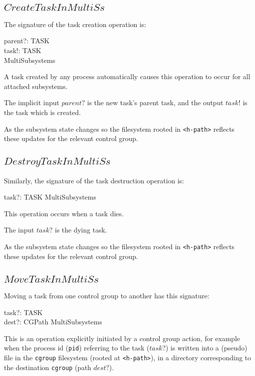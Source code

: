 \documentclass[a4paper,twoside,12pt]{article}
\begin{document}
\subsection{$CreateTaskInMultiSs$}

The signature of the task creation operation is:
\begin{schema*}
    parent?: TASK \\
    task!: TASK \\
\also
    \Delta MultiSubsystems
\end{schema*}
A task created by any process automatically causes this operation to occur for all attached subsystems.

The implicit input $parent?$ is the new task's parent task, and the output $task!$ is the task which is created.

As the subsystem state changes so the
filesystem rooted in \texttt{<h-path>} reflects these updates for the relevant control group.

\subsection{$DestroyTaskInMultiSs$}

Similarly, the signature of the task destruction operation is:
\begin{schema*}
    task?: TASK
\also 
    \Delta MultiSubsystems
\end{schema*}
This operation occurs when a task dies.

The input $task?$ is the dying task.

As the subsystem state changes so the
filesystem rooted in \texttt{<h-path>} reflects these updates for the relevant control group.


\subsection{$MoveTaskInMultiSs$}

Moving a task from one control group to another has this signature:
\begin{schema*}
    task?: TASK \\
    dest?: CGPath
\also 
    \Delta MultiSubsystems
\end{schema*}
This is an operation explicitly initiated by a control group action, for example when
the process id (\texttt{pid}) referring to the task ($task?$) is written into a 
(pseudo) file in the \texttt{cgroup} filesystem 
(rooted at \texttt{<h-path>}),
in a directory corresponding to the destination \texttt{cgroup} (path $dest?$).
\end{document}
